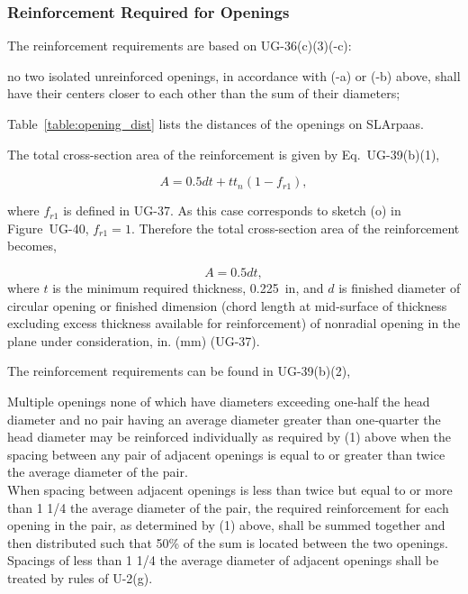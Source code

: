 \subsubsection{Reinforcement Required for Openings}
\label{app:opening_reinforcement}

The reinforcement requirements are based on UG-36(c)(3)(-c):

\begin{displayquote}
    no two isolated unreinforced openings, in accordance with (-a) 
    or (-b) above, shall have their centers closer to each other than 
    the sum of their diameters;
\end{displayquote}

Table~\ref{table:opening_dist} lists the distances of the openings on SLArpaas.



The total cross-section area of the reinforcement is given by 
Eq.~UG-39(b)(1),

\begin{equation}
    A = 0.5dt + tt_n(1-f_{r1}),
\end{equation}

where $f_{r1}$ is defined in UG-37. 
As this case corresponds to sketch (o) in Figure~UG-40,
$f_{r1} = 1$.
Therefore the total cross-section area of the reinforcement becomes,

\begin{equation}
    A = 0.5dt,
\end{equation}
where $t$ is the minimum required thickness, 0.225~in,
and $d$ is finished diameter of circular opening or finished dimension 
(chord length at mid-surface of thickness excluding excess thickness 
available for reinforcement) of nonradial opening in the plane under 
consideration, in. (mm) (UG-37).

The reinforcement requirements can be found in UG-39(b)(2),

\begin{displayquote}
    Multiple openings none of which have diameters exceeding one‐half 
    the head diameter and no pair having an average diameter greater 
    than one‐quarter the head diameter may be reinforced individually 
    as required by (1) above when the spacing between any pair of 
    adjacent openings is equal to or greater than twice the average 
    diameter of the pair.\\

    When spacing between adjacent openings is less than twice but equal 
    to or more than 1 1/4 the average diameter of the pair, the required 
    reinforcement for each opening in the pair, as determined by (1) 
    above, shall be summed together and then distributed such that 50\% 
    of the sum is located between the two openings. 
    Spacings of less than 1 1/4 the average diameter of adjacent openings 
    shall be treated by rules of U-2(g).
\end{displayquote}

